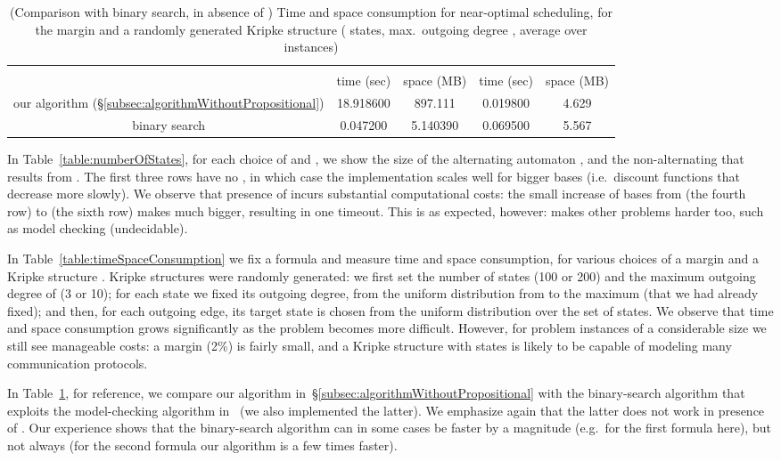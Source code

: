 \documentclass[a4paper,USenglish,numberwithinsect]{lipics}
\theoremstyle{definition}
\theoremstyle{remark}
\theoremstyle{plain}
\begin{document}
\begin{table}[tb]
\begingroup
\renewcommand{\arraystretch}{1.5}
\begin{tabular}{c|c|c|c|c}& \multicolumn{2}{c|}{} & \multicolumn{2}{c}{} \\ \cline{2-5}
 &  time (sec)  &  space (MB) &  time (sec)  &  space (MB) 
 \\ \hhline{=====}
our algorithm (\S{}\ref{subsec:algorithmWithoutPropositional}) & 18.918600 & 897.111 & 0.019800 & 4.629 \\ \hline
binary search & 0.047200 & 5.140390 & 0.069500 & 5.567
\end{tabular}
\endgroup
\caption{(Comparison with binary search, in absence of ) Time and space consumption for near-optimal scheduling, for the margin  and a randomly
 generated Kripke structure  ( states, max.\ outgoing degree , average over
  instances)}
\label{table:comparisonWithBinarySearch}
\end{table}
In Table~\ref{table:numberOfStates}, for each choice of  and
,  we show the size of the alternating automaton
,
and the non-alternating  that results
from . 
The first three rows have no , in which case the implementation
scales well for bigger bases (i.e.\ discount functions that decrease more
slowly). We observe that presence of  incurs substantial
computational costs: the small increase of bases from  (the
fourth row) to
  (the sixth row) makes  much
 bigger, resulting in  one timeout. This is as expected, however: 
 makes other problems  harder too, such as model checking (undecidable).

In Table~\ref{table:timeSpaceConsumption} we fix a formula  and measure time and space
 consumption, for various choices of a margin  and a Kripke
 structure . 
 Kripke structures  were randomly generated: 
we first set the number of states (100 or 200) and the maximum outgoing
  degree of  (3 or 10); for each state we fixed its outgoing degree,
  from the uniform distribution from  to the maximum (that we had
  already fixed); and then, for each outgoing edge, its target state is chosen
  from the uniform distribution over the set of states.
We observe that time and space consumption grows significantly as the
 problem becomes more difficult. However, for problem instances of a
 considerable size we still see manageable costs: a
 margin  (2\%) is fairly small, and 
 a Kripke structure  with  states is likely to be capable of
 modeling many communication protocols.

In Table~\ref{table:comparisonWithBinarySearch}, for reference, we
compare our algorithm in~\S{}\ref{subsec:algorithmWithoutPropositional}
with the binary-search algorithm that exploits the model-checking
algorithm in~\cite{AlmagorBK14} (we also implemented the latter). We
emphasize again that the latter does not work in presence of
. Our experience shows that the binary-search algorithm can in
some
cases be faster by a magnitude (e.g.\ for the first formula here), but not
always (for the second formula our algorithm is a few times faster). 
\end{document}
